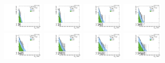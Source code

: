 \begin{figure}[htbp]
  \includegraphics[width=0.18\textwidth]{fig/fitValidation/PostFit_SR_MVV_MJJ070to110__mu_HP_vbf_LDy_Run2.pdf}
  \includegraphics[width=0.18\textwidth]{fig/fitValidation/PostFit_SR_MVV_MJJ070to110__e_HP_vbf_LDy_Run2.pdf}
  \includegraphics[width=0.18\textwidth]{fig/fitValidation/PostFit_SR_MVV_MJJ070to110__mu_LP_vbf_LDy_Run2.pdf}
  \includegraphics[width=0.18\textwidth]{fig/fitValidation/PostFit_SR_MVV_MJJ070to110__e_LP_vbf_LDy_Run2.pdf}\\
  \includegraphics[width=0.18\textwidth]{fig/fitValidation/PostFit_SR_MVV_MJJ070to110__mu_HP_bb_HDy_Run2.pdf}
  \includegraphics[width=0.18\textwidth]{fig/fitValidation/PostFit_SR_MVV_MJJ070to110__e_HP_bb_HDy_Run2.pdf}
  \includegraphics[width=0.18\textwidth]{fig/fitValidation/PostFit_SR_MVV_MJJ070to110__mu_LP_bb_HDy_Run2.pdf}
  \includegraphics[width=0.18\textwidth]{fig/fitValidation/PostFit_SR_MVV_MJJ070to110__e_LP_bb_HDy_Run2.pdf}\\

\end{figure}
